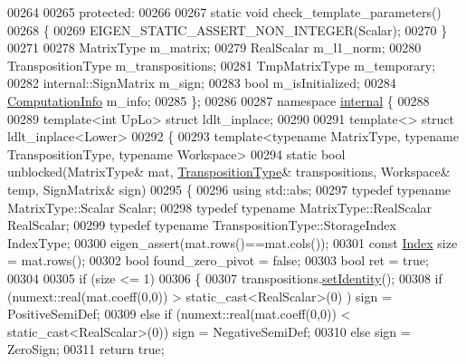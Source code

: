 \begin{DoxyCode}
00264 
00265   \textcolor{keyword}{protected}:
00266 
00267     \textcolor{keyword}{static} \textcolor{keywordtype}{void} check\_template\_parameters()
00268     \{
00269       EIGEN\_STATIC\_ASSERT\_NON\_INTEGER(Scalar);
00270     \}
00271 
00278     MatrixType m\_matrix;
00279     RealScalar m\_l1\_norm;
00280     TranspositionType m\_transpositions;
00281     TmpMatrixType m\_temporary;
00282     internal::SignMatrix m\_sign;
00283     \textcolor{keywordtype}{bool} m\_isInitialized;
00284     \hyperlink{group__enums_ga85fad7b87587764e5cf6b513a9e0ee5e}{ComputationInfo} m\_info;
00285 \};
00286 
00287 \textcolor{keyword}{namespace }\hyperlink{namespaceinternal}{internal} \{
00288 
00289 \textcolor{keyword}{template}<\textcolor{keywordtype}{int} UpLo> \textcolor{keyword}{struct }ldlt\_inplace;
00290 
00291 \textcolor{keyword}{template}<> \textcolor{keyword}{struct }ldlt\_inplace<Lower>
00292 \{
00293   \textcolor{keyword}{template}<\textcolor{keyword}{typename} MatrixType, \textcolor{keyword}{typename} TranspositionType, \textcolor{keyword}{typename} Workspace>
00294   \textcolor{keyword}{static} \textcolor{keywordtype}{bool} unblocked(MatrixType& mat, \hyperlink{group___core___module}{TranspositionType}& transpositions, Workspace& 
      temp, SignMatrix& sign)
00295   \{
00296     \textcolor{keyword}{using} std::abs;
00297     \textcolor{keyword}{typedef} \textcolor{keyword}{typename} MatrixType::Scalar Scalar;
00298     \textcolor{keyword}{typedef} \textcolor{keyword}{typename} MatrixType::RealScalar RealScalar;
00299     \textcolor{keyword}{typedef} \textcolor{keyword}{typename} TranspositionType::StorageIndex IndexType;
00300     eigen\_assert(mat.rows()==mat.cols());
00301     \textcolor{keyword}{const} \hyperlink{group___cholesky___module_ad9c57eb2fb3bbccd51b9d2e111bea355}{Index} size = mat.rows();
00302     \textcolor{keywordtype}{bool} found\_zero\_pivot = \textcolor{keyword}{false};
00303     \textcolor{keywordtype}{bool} ret = \textcolor{keyword}{true};
00304 
00305     \textcolor{keywordflow}{if} (size <= 1)
00306     \{
00307       transpositions.\hyperlink{class_eigen_1_1_transpositions_base_a8da379438691ea694948ea5ae31d305f}{setIdentity}();
00308       \textcolor{keywordflow}{if} (numext::real(mat.coeff(0,0)) > static\_cast<RealScalar>(0) ) sign = PositiveSemiDef;
00309       \textcolor{keywordflow}{else} \textcolor{keywordflow}{if} (numext::real(mat.coeff(0,0)) < static\_cast<RealScalar>(0)) sign = NegativeSemiDef;
00310       \textcolor{keywordflow}{else} sign = ZeroSign;
00311       \textcolor{keywordflow}{return} \textcolor{keyword}{true};

\end{DoxyCode}
